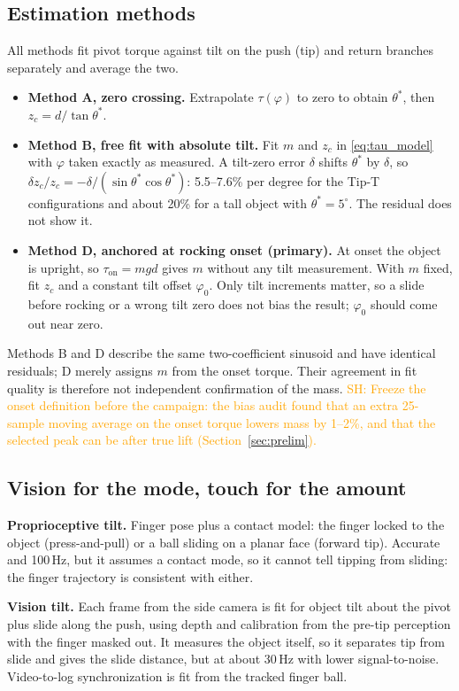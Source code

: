 \documentclass[10pt, conference]{IEEEtran}
\newcommand{\sh}[1]{\textcolor{orange}{SH: #1}}
\begin{document}
\subsection{Estimation methods}
All methods fit pivot torque against tilt on the push (tip) and return branches separately and average the two.
\begin{itemize}
  \item \textbf{Method A, zero crossing.} Extrapolate $\tau(\varphi)$ to zero to obtain $\theta^{*}$, then $z_c = d/\tan\theta^{*}$.
  \item \textbf{Method B, free fit with absolute tilt.} Fit $m$ and $z_c$ in \eqref{eq:tau_model} with $\varphi$ taken exactly as measured. A tilt-zero error $\delta$ shifts $\theta^{*}$ by $\delta$, so $\delta z_c/z_c = -\delta/(\sin\theta^{*}\cos\theta^{*})$: 5.5--7.6\% per degree for the Tip-T configurations and about 20\% for a tall object with $\theta^{*} = 5^\circ$. The residual does not show it.
  \item \textbf{Method D, anchored at rocking onset (primary).} At onset the object is upright, so $\tau_{\mathrm{on}} = m g d$ gives $m$ without any tilt measurement. With $m$ fixed, fit $z_c$ and a constant tilt offset $\varphi_0$. Only tilt increments matter, so a slide before rocking or a wrong tilt zero does not bias the result; $\varphi_0$ should come out near zero.
\end{itemize}
Methods B and D describe the same two-coefficient sinusoid and have identical residuals; D merely assigns $m$ from the onset torque. Their agreement in fit quality is therefore not independent confirmation of the mass. \sh{Freeze the onset definition before the campaign: the bias audit found that an extra 25-sample moving average on the onset torque lowers mass by 1--2\%, and that the selected peak can be after true lift (Section~\ref{sec:prelim}).}

\subsection{Vision for the mode, touch for the amount}
\noindent \textbf{Proprioceptive tilt.} Finger pose plus a contact model: the finger locked to the object (press-and-pull) or a ball sliding on a planar face (forward tip). Accurate and 100\,Hz, but it assumes a contact mode, so it cannot tell tipping from sliding: the finger trajectory is consistent with either.

\noindent \textbf{Vision tilt.} Each frame from the side camera is fit for object tilt about the pivot plus slide along the push, using depth and calibration from the pre-tip perception with the finger masked out. It measures the object itself, so it separates tip from slide and gives the slide distance, but at about 30\,Hz with lower signal-to-noise. Video-to-log synchronization is fit from the tracked finger ball.
\end{document}
